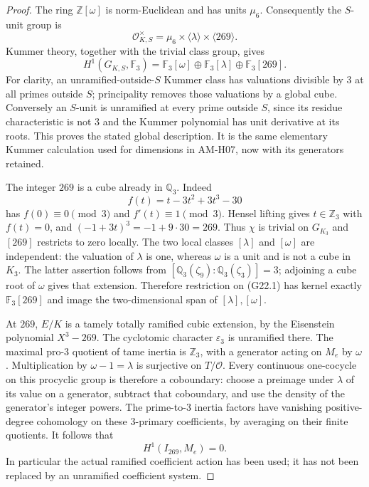 \begin{proof}
The ring $\mathbb Z[\omega]$ is norm-Euclidean and has units $\mu_6$.
Consequently the $S$-unit group is
\[
 \mathcal O_{K,S}^{\times}
   =\mu_6\times\langle\lambda\rangle\times\langle269\rangle.
\]
Kummer theory, together with the trivial class group, gives
\[
 H^1(G_{K,S},\mathbb F_3)
   =\mathbb F_3[\omega]\oplus
     \mathbb F_3[\lambda]\oplus
     \mathbb F_3[269].                                  \tag{G22.1}
\]
For clarity, an unramified-outside-$S$ Kummer class has valuations
divisible by $3$ at all primes outside $S$; principality removes those
valuations by a global cube.  Conversely an $S$-unit is unramified at
every prime outside $S$, since its residue characteristic is not $3$
and the Kummer polynomial has unit derivative at its roots.  This
proves the stated global description.  It is the same elementary
Kummer calculation used for dimensions in AM-H07, now with its
generators retained.

The integer $269$ is a cube already in $\mathbb Q_3$.  Indeed
\[
 f(t)=t-3t^2+3t^3-30
\]
has $f(0)\equiv0\pmod3$ and $f'(t)\equiv1\pmod3$.
Hensel lifting gives $t\in\mathbb Z_3$ with $f(t)=0$, and
$(-1+3t)^3=-1+9\cdot30=269$.
Thus $\chi$ is trivial on $G_{K_3}$ and $[269]$ restricts to zero
locally.  The two local classes $[\lambda]$ and $[\omega]$ are
independent: the valuation of $\lambda$ is one, whereas $\omega$ is
a unit and is not a cube in $K_3$.  The latter assertion follows from
$[\mathbb Q_3(\zeta_9):\mathbb Q_3(\zeta_3)]=3$; adjoining a cube
root of $\omega$ gives that extension.  Therefore restriction on
(G22.1) has kernel exactly $\mathbb F_3[269]$ and image the
two-dimensional span of $[\lambda],[\omega]$.

At $269$, $E/K$ is a tamely totally ramified cubic extension, by the
Eisenstein polynomial $X^3-269$.  The cyclotomic character
$\varepsilon_3$ is unramified there.  The maximal pro-$3$ quotient
of tame inertia is $\mathbb Z_3$, with a generator acting on $M_e$
by $\omega$.  Multiplication by $\omega-1=\lambda$ is surjective
on $T/\mathcal O$.  Every continuous one-cocycle on this procyclic
group is therefore a coboundary: choose a preimage under $\lambda$
of its value on a generator, subtract that coboundary, and use the
density of the generator's integer powers.  The prime-to-$3$ inertia
factors have vanishing positive-degree cohomology on these
$3$-primary coefficients, by averaging on their finite quotients.
It follows that
\[
 H^1(I_{269},M_e)=0.                                    \tag{G22.2}
\]
In particular the actual ramified coefficient action has been used;
it has not been replaced by an unramified coefficient system.


\end{proof}
